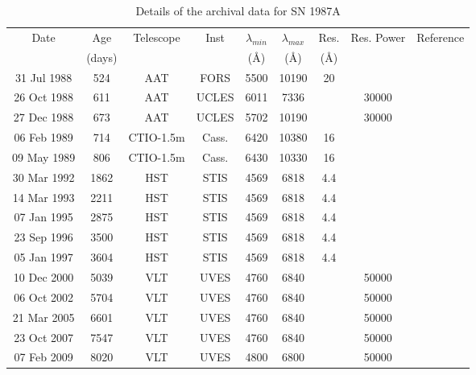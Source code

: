 \begin{table*}
	\begin{minipage}{180mm}
	\caption{Details of the archival data for SN 1987A}
	\label{tb:data}
  	\begin{tabular}{@{} ccccccccl @{}}
    	\hline
	Date & Age & Telescope  & Inst & $\lambda_{min}$ & $\lambda_{max}$ & Res. & Res. Power & Reference \\
	& (days) & & &(\AA) & (\AA)& (\AA)\\
	\hline
31 Jul 1988 & 524 & AAT & FORS & 5500 & 10190 & 20 & & \citet{Spyromilio1991} \\
26 Oct 1988 & 611 & AAT & UCLES & 6011 & 7336 &  & 30000 & \citet{Hanuschik1993, Spyromilio1993a}\\
27 Dec 1988 & 673 & AAT & UCLES & 5702 & 10190 &  & 30000 & \citet{Hanuschik1993, Spyromilio1993a}\\
06 Feb 1989 & 714 & CTIO-1.5m & Cass. & 6420 & 10380 & 16 & & \citet{Phillips1990}\\
09 May 1989 & 806 & CTIO-1.5m & Cass. & 6430 & 10330 & 16 & & \citet{Phillips1990}\\
30 Mar 1992 & 1862 & HST & STIS & 4569 & 6818 & 4.4 &  & \citet{Wang1996}\\
14 Mar 1993 & 2211 & HST & STIS & 4569 & 6818 & 4.4 &  & \citet{Wang1996}\\
07 Jan 1995 & 2875 & HST & STIS & 4569 & 6818 & 4.4 &  & \citet{Chugai1997}\\
23 Sep 1996 & 3500 & HST & STIS & 4569 & 6818 & 4.4 &  \\
05 Jan 1997 & 3604 & HST & STIS & 4569 & 6818 & 4.4 &  \\
10 Dec 2000 & 5039 & VLT & UVES & 4760 & 6840 &  & 50000 & \citet{Groeningsson2006, Groeningsson2007}\\
06 Oct 2002 & 5704 & VLT & UVES & 4760 & 6840 &  & 50000 & \citet{Groeningsson2006, Groeningsson2007, Groningsson2008}\\
21 Mar 2005 & 6601 & VLT & UVES & 4760 & 6840 &  & 50000 &\citet{Groeningsson2006, Groeningsson2007}\\
23 Oct 2007 & 7547 & VLT & UVES & 4760 & 6840 &  & 50000 & \citet{Groeningsson2007}\\
07 Feb 2009 & 8020 & VLT & UVES & 4800 & 6800 &  & 50000 & \citet{Tziamtzis2010}\\
    \hline
  \end{tabular}
\end{minipage}
\end{table*}


